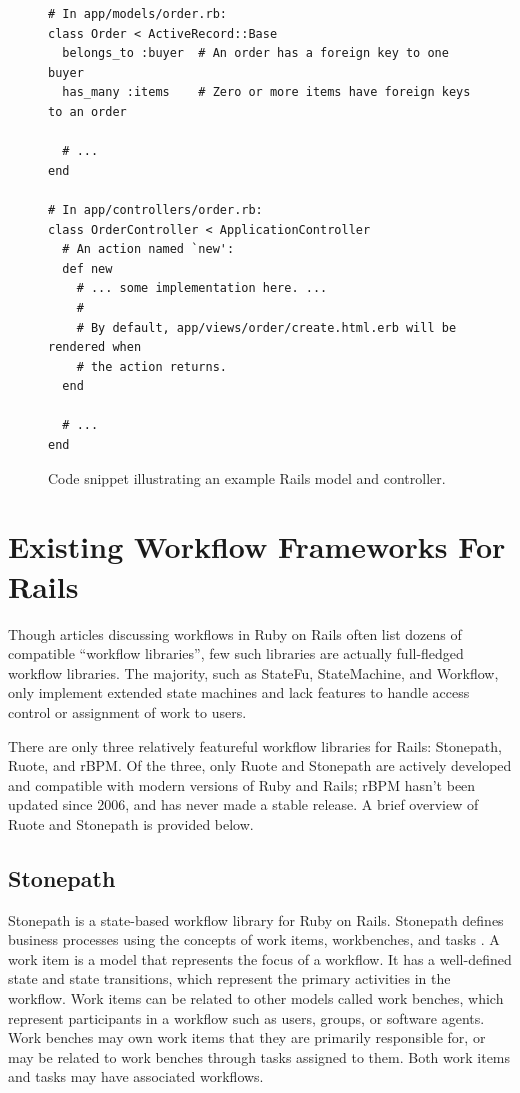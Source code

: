 \documentclass[document.tex]{subfiles}
\begin{document}
\begin{figure}[!ht]
  \begin{lstlisting}
# In app/models/order.rb:
class Order < ActiveRecord::Base
  belongs_to :buyer  # An order has a foreign key to one buyer
  has_many :items    # Zero or more items have foreign keys to an order

  # ...
end

# In app/controllers/order.rb:
class OrderController < ApplicationController
  # An action named `new':
  def new
    # ... some implementation here. ...
    #
    # By default, app/views/order/create.html.erb will be rendered when
    # the action returns.
  end

  # ...
end
  \end{lstlisting}
  \cprotect\caption{Code snippet illustrating an example Rails model and controller.}
  \label{fig:background-rails-code}
\end{figure}


\section {Existing Workflow Frameworks For Rails}
\label {sec:evaluating-existing-workflow-frameworks}

Though articles discussing workflows in Ruby on Rails often list dozens of compatible ``workflow libraries'', few such libraries are actually full-fledged workflow libraries. The majority, such as StateFu, StateMachine, and Workflow, only implement extended state machines and lack features to handle access control or assignment of work to users.

There are only three relatively featureful workflow libraries for Rails: Stonepath, Ruote, and rBPM. Of the three, only Ruote and Stonepath are actively developed and compatible with modern versions of Ruby and Rails; rBPM hasn't been updated since 2006, and has never made a stable release. A brief overview of Ruote and Stonepath is provided below.

\subsection {Stonepath}

Stonepath is a state-based workflow library for Ruby on Rails. Stonepath defines business processes using the concepts of work items, workbenches, and tasks \cite{stonepath}. A work item is a model that represents the focus of a workflow. It has a well-defined state and state transitions, which represent the primary activities in the workflow. Work items can be related to other models called work benches, which represent participants in a workflow such as users, groups, or software agents. Work benches may own work items that they are primarily responsible for, or may be related to work benches through tasks assigned to them. Both work items and tasks may have associated workflows.
\end{document}

